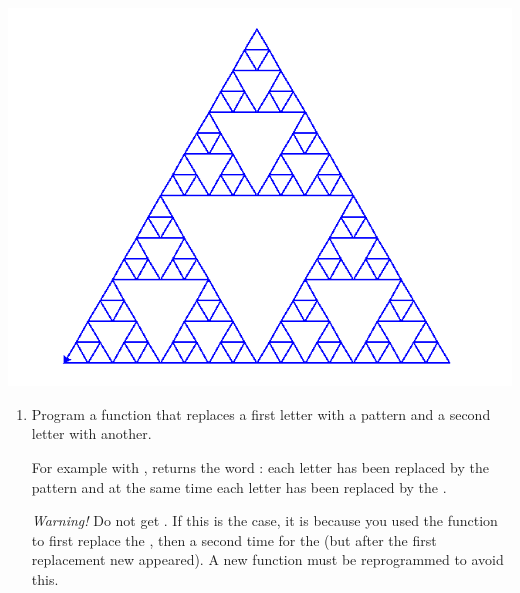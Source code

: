 \documentclass[11pt,class=report,crop=false]{standalone}
\begin{document}
\begin{activite}



\begin{center}	
\includegraphics[scale=\myscale,scale=0.35]{screen-lsystems-7e}
\end{center}

\begin{enumerate}
  \item Program a function  that replaces a first letter with a pattern and a second letter with another. 

For example with ,  returns the word : each letter  has been replaced by the pattern  and at the same time each letter  has been replaced by the .

\emph{Warning!} Do not get . If this is the case, it is because you used the  function to first replace the , then a second time for the  (but after the first replacement new  appeared). A new function must be reprogrammed to avoid this. 


\end{enumerate}
\end{activite}
\end{document}
